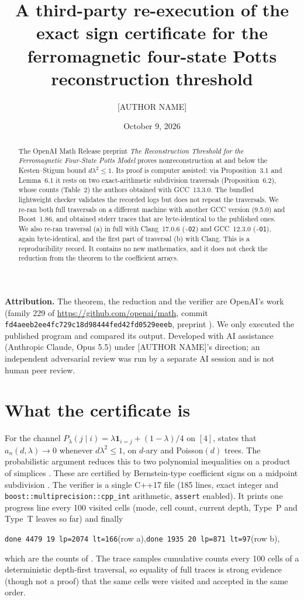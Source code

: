 \documentclass[11pt]{amsart}
\title[Re-execution of the four-state Potts sign certificate]{A third-party re-execution of the exact sign certificate for the ferromagnetic four-state Potts reconstruction threshold}
\author{[AUTHOR NAME]}
\date{October 9, 2026}
\begin{document}
\begin{abstract}
The OpenAI Math Release preprint \emph{The Reconstruction Threshold for the Ferromagnetic Four-State
Potts Model} proves nonreconstruction at and below the Kesten--Stigum bound $d\lambda^2\le1$. Its proof
is computer assisted: via Proposition~3.1 and Lemma~6.1 it rests on two exact-arithmetic subdivision
traversals (Proposition~6.2), whose counts (Table~2) the authors obtained with GCC~13.3.0. The bundled lightweight checker validates the
recorded logs but does not repeat the traversals. We re-ran both full traversals on a different
machine with another GCC version (9.5.0) and Boost~1.86, and obtained stderr traces that are
byte-identical to the published ones. We also re-ran traversal (a) in full with Clang~17.0.6
(\texttt{-O2}) and GCC~12.3.0 (\texttt{-O1}), again byte-identical, and the first
part of traversal (b) with Clang. This is a reproducibility record. It contains no new mathematics, and it
does not check the reduction from the theorem to the coefficient arrays.
\end{abstract}
\maketitle

\noindent\textbf{Attribution.} The theorem, the reduction and the verifier
 are OpenAI's work (family 229 of
\url{https://github.com/openai/math}, commit \nolinkurl{fd4aeeb2ee4fc729c18d98444fed42fd0529eeeb},
preprint \cite{oai}). We only executed the published program and compared its output.
Developed with AI assistance (Anthropic Claude, Opus 5.5) under [AUTHOR NAME]'s direction; an
independent adversarial review was run by a separate AI session and is not human peer review.

\section{What the certificate is}
For the channel $P_\lambda(j\mid i)=\lambda\mathbf 1_{i=j}+(1-\lambda)/4$ on $[4]$, \cite[Theorem~1.1]{oai}
states that $a_n(d,\lambda)\to0$ whenever $d\lambda^2\le1$, on $d$-ary and Poisson$(d)$ trees. The
probabilistic argument reduces this to two polynomial inequalities on a product of simplices
\cite[Proposition~3.1]{oai}. These are certified by Bernstein-type coefficient signs on a midpoint
subdivision \cite[Lemma~6.1, Proposition~6.2]{oai}. The verifier is a single C++17 file (185 lines,
exact integer and \texttt{boost::multiprecision::cpp\_int} arithmetic, \texttt{assert} enabled). It
prints one progress line every 100 visited cells (mode, cell count, current depth, Type~P and Type~T
leaves so far) and finally
\begin{center}
\texttt{done 4479 19 lp=2074 lt=166}\quad (row a),\qquad \texttt{done 1935 20 lp=871 lt=97}\quad (row b),
\end{center}
which are the counts of \cite[Table~2]{oai}. The trace samples cumulative counts every 100 cells of a
deterministic depth-first traversal, so equality of full traces is strong evidence (though not a proof)
that the same cells were visited and accepted in the same order.
\end{document}
